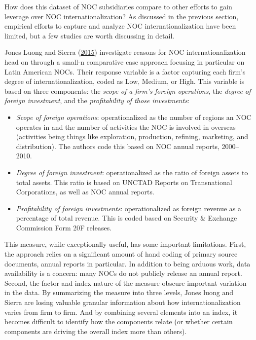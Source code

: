 \documentclass[11pt,]{book}
\providecommand{\tightlist}{%
  \setlength{\itemsep}{0pt}\setlength{\parskip}{0pt}}
\begin{document}
How does this dataset of NOC subsidiaries compare to other efforts to gain leverage over NOC internationalization? As discussed in the previous section, empirical efforts to capture and analyze NOC internationalization have been limited, but a few studies are worth discussing in detail.

Jones Luong and Sierra (\protect\hyperlink{ref-jones_luong_domestic_2015}{2015}) investigate reasons for NOC internationalization head on through a small-n comparative case approach focusing in particular on Latin American NOCs. Their response variable is a factor capturing each firm's degree of internationalization, coded as Low, Medium, or High. This variable is based on three components: the \emph{scope of a firm's foreign operations}, the \emph{degree of foreign investment}, and the \emph{profitability of those investments}:

\begin{itemize}
\tightlist
\item
  \emph{Scope of foreign operations}: operationalized as the number of regions an NOC operates in and the number of activities the NOC is involved in overseas (activities being things like exploration, production, refining, marketing, and distribution). The authors code this based on NOC annual reports, 2000--2010.
\item
  \emph{Degree of foreign investment}: operationalized as the ratio of foreign assets to total assets. This ratio is based on UNCTAD Reports on Transnational Corporations, as well as NOC annual reports.
\item
  \emph{Profitability of foreign investments}: operationalized as foreign revenue as a percentage of total revenue. This is coded based on Security \& Exchange Commission Form 20F releases.
\end{itemize}

This measure, while exceptionally useful, has some important limitations. First, the approach relies on a significant amount of hand coding of primary source documents, annual reports in particular. In addition to being arduous work, data availability is a concern: many NOCs do not publicly release an annual report. Second, the factor and index nature of the measure obscure important variation in the data. By summarizing the measure into three levels, Jones luong and Sierra are losing valuable granular information about how internationalization varies from firm to firm. And by combining several elements into an index, it becomes difficult to identify how the components relate (or whether certain components are driving the overall index more than others).
\end{document}
